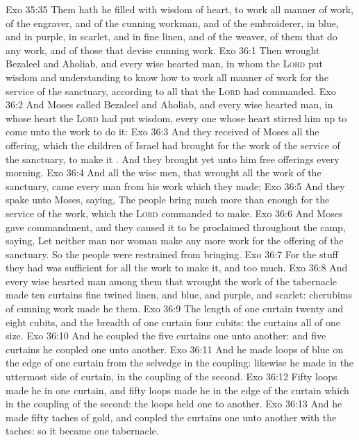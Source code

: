 \vs Exo 35:35 Them hath he filled with wisdom of heart, to work all manner of work, of the engraver, and of the cunning workman, and of the embroiderer, in blue, and in purple, in scarlet, and in fine linen, and of the weaver,  of them that do any work, and of those that devise cunning work.
\vs Exo 36:1 Then wrought Bezaleel and Aholiab, and every wise hearted man, in whom the \textsc{Lord} put wisdom and understanding to know how to work all manner of work for the service of the sanctuary, according to all that the \textsc{Lord} had commanded.
\vs Exo 36:2 And Moses called Bezaleel and Aholiab, and every wise hearted man, in whose heart the \textsc{Lord} had put wisdom,  every one whose heart stirred him up to come unto the work to do it:
\vs Exo 36:3 And they received of Moses all the offering, which the children of Israel had brought for the work of the service of the sanctuary, to make it . And they brought yet unto him free offerings every morning.
\vs Exo 36:4 And all the wise men, that wrought all the work of the sanctuary, came every man from his work which they made;
\vs Exo 36:5 And they spake unto Moses, saying, The people bring much more than enough for the service of the work, which the \textsc{Lord} commanded to make.
\vs Exo 36:6 And Moses gave commandment, and they caused it to be proclaimed throughout the camp, saying, Let neither man nor woman make any more work for the offering of the sanctuary. So the people were restrained from bringing.
\vs Exo 36:7 For the stuff they had was sufficient for all the work to make it, and too much.
\vs Exo 36:8 And every wise hearted man among them that wrought the work of the tabernacle made ten curtains  fine twined linen, and blue, and purple, and scarlet:  cherubims of cunning work made he them.
\vs Exo 36:9 The length of one curtain  twenty and eight cubits, and the breadth of one curtain four cubits: the curtains  all of one size.
\vs Exo 36:10 And he coupled the five curtains one unto another: and  five curtains he coupled one unto another.
\vs Exo 36:11 And he made loops of blue on the edge of one curtain from the selvedge in the coupling: likewise he made in the uttermost side of  curtain, in the coupling of the second.
\vs Exo 36:12 Fifty loops made he in one curtain, and fifty loops made he in the edge of the curtain which  in the coupling of the second: the loops held one  to another.
\vs Exo 36:13 And he made fifty taches of gold, and coupled the curtains one unto another with the taches: so it became one tabernacle.
